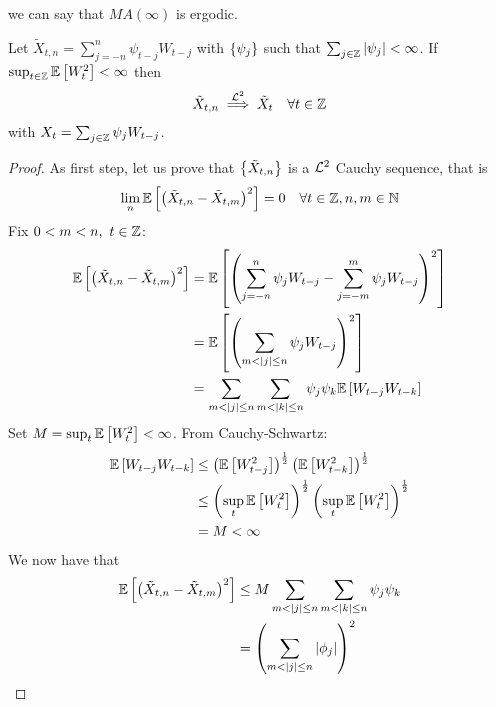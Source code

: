 we can say that $MA(\infty)$ is ergodic.

\begin{theorem}
    Let $\tilde{X}_{t,n}=\sum_{j=-n}^n\psi_{t-j}W_{t-j}$ with $\left\{\psi_j\right\}$ such that $\sum_{j\in\mathbb{Z}}\left|\psi_j\right|<\infty$. If $\sup_{t\in\mathbb{Z}}\mathbb{E}\left[W_t^2\right]<\infty$ then
    \[
        \tilde{X}_{t,n}\stackrel{\el{2}}{\implies}\tilde{X}_t\ \ \ \forall t\in\Z  
    \]
    with $X_t=\sum_{j\in\mathbb{Z}}\psi_jW_{t-j}$.
\end{theorem}

\begin{proof}
    As first step, let us prove that $\left\{\tilde{X}_{t,n}\right\}$ is a $\mathcal{L}^{2}$ Cauchy sequence, that is
    \[
        \lim_n\expect{\left(\tilde{X}_{t,n}-\tilde{X}_{t,m}\right)^2}=0\ \ \ \forall t\in\Z,n,m\in\N  
    \]
    Fix $0<m<n,\ t\in\mathbb{Z}$:
    \begin{equation*}
        \begin{split}
            \mathbb{E}\left[\left(\tilde{X}_{t,n}-\tilde{X}_{t,m}\right)^2\right]&=\mathbb{E}\left[\left(\sum_{j=-n}^n\psi_jW_{t-j}-\sum_{j=-m}^m\psi_jW_{t-j}\right)^2\right]\\
            &=\mathbb{E}\left[\left(\sum_{m<\left|j\right|\le n}\psi_jW_{t-j}\right)^2\right]\\
            &=\sum_{m<\left|j\right|\le n}\sum_{m<\left|k\right|\le n}\psi_j\psi_k\mathbb{E}\left[W_{t-j}W_{t-k}\right]\\
        \end{split}
    \end{equation*}
    Set $M=\sup_t\mathbb{E}\left[W_t^2\right]<\infty$. From Cauchy-Schwartz:
    \begin{equation*}
        \begin{split}
            \mathbb{E}\left[W_{t-j}W_{t-k}\right]&\le\left(\mathbb{E}\left[W_{t-j}^2\right]\right)^\frac{1}{2}\left(\mathbb{E}\left[W_{t-k}^2\right]\right)^\frac{1}{2}\\
            &\le\left(\sup_t\mathbb{E}\left[W_t^2\right]\right)^\frac{1}{2}\left(\sup_t\mathbb{E}\left[W_t^2\right]\right)^\frac{1}{2}\\
            &=M<\infty\\
        \end{split}
    \end{equation*}
    We now have that
    \begin{equation*}
        \begin{split}
            \expect{\left(\tilde{X}_{t,n}-\tilde{X}_{t,m}\right)^2}&\le M\sum_{m<\abs{j}\le n}\sum_{m<\abs{k}\le n}\psi_j\psi_k\\
            &=\left(\sum_{m<\abs{j}\le n}\abs{\phi_j}\right)^2\\

\end{split}
\end{equation*}
\end{proof}
